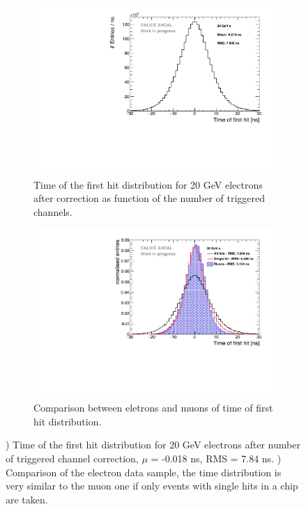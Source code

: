 \begin{figure}[htbp!]
	\begin{subfigure}[t]{0.45\textwidth}
		\centering
		\includegraphics[width=1\textwidth]{chap5/fig_AHCAL_timing/Electrons/Timing_AllLayers_20GeV.pdf}
		\caption{Time of the first hit distribution for 20 GeV electrons after correction as function of the number of triggered channels.}\label{fig:timing_electrons_corr}
	\end{subfigure}
	\hfill
	\begin{subfigure}[t]{0.45\textwidth}
		\centering
		\includegraphics[width=1\textwidth]{chap5/fig_AHCAL_timing/Electrons/ComparisonAll_ElectronsSingleHit.pdf}
		\caption{Comparison between eletrons and muons of time of first hit distribution.}\label{fig:timing_electron_muon_comp}
	\end{subfigure}
	\caption{) Time of the first hit distribution for 20 GeV electrons after number of triggered channel correction, $\mu$ = -0.018 ns, RMS = 7.84 ns. ) Comparison of the electron data sample, the time distribution is very similar to the muon one if only events with single hits in a chip are taken.}
\end{figure}

